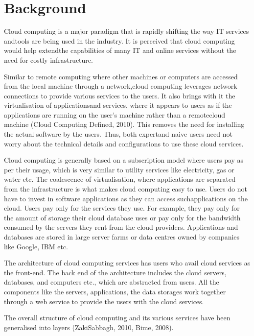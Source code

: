 \chapter{Background}

Cloud computing is a major paradigm that is rapidly shifting the way \ac{IT}
services andtools are being used in the industry. It is perceived that cloud computing
would help extendthe capabilities of many \ac{IT} and online services without
the need for costly infrastructure.

Similar to remote computing where other machines or computers are accessed from
the local machine through a network,cloud computing leverages network
connections to provide various services to the users. It also brings with it the
virtualisation of applicationsand services, where it appears to users as if the
applications are running on the user’s machine rather than a remotecloud machine
(Cloud Computing Defined, 2010). This removes the need for installing the actual
software by the users. Thus, both expertand naive users need not worry about the
technical details and configurations to use these cloud services.

Cloud computing is generally based on a subscription model where users pay as
per their usage, which is very similar to utility services like electricity, gas
or water etc. The coalescence of virtualisation, where applications are
separated from the infrastructure is what makes cloud computing easy to use.
Users do not have to invest in software applications as they can access
suchapplications on the cloud. Users pay only for the services they use. For
example, they pay only for the amount of storage their cloud database uses or
pay only for the bandwidth consumed by the servers they rent from the cloud
providers. Applications and databases are stored in large server farms or data
centres owned by companies like Google, IBM etc.

The architecture of cloud computing services has users who avail cloud services
as the front-end. The back end of the architecture includes the cloud servers,
databases, and computers etc., which are abstracted from users. All
the components like the servers, applications, the data storages work together
through a web service to provide the users with the cloud services.

The overall structure of cloud computing and its various services have been
generalised into layers (ZakiSabbagh, 2010, Bime, 2008).

